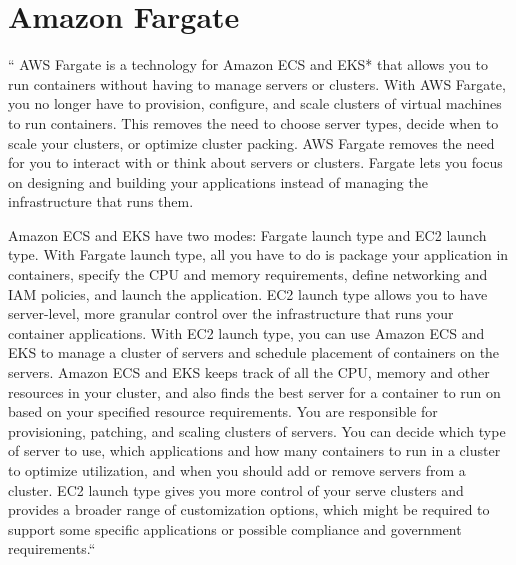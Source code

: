 \section{Amazon Fargate}

`` AWS Fargate is a technology for Amazon ECS and EKS* that allows you to run 
containers without having to manage servers or clusters. With AWS Fargate, you 
no longer have to provision, configure, and scale clusters of virtual machines 
to run containers. This removes the need to choose server types, decide when
to scale your clusters, or optimize cluster packing. AWS Fargate removes the 
need for you to interact with or think about servers or clusters. Fargate lets 
you focus on designing and building your applications instead of managing
the infrastructure that runs them.


Amazon ECS and EKS have two modes: Fargate launch type and EC2 launch type.
With Fargate launch type, all you have to do is package your application in 
containers, specify the CPU and memory requirements, define networking and 
IAM policies, and launch the application. EC2 launch type allows you to have 
server-level, more granular control over the infrastructure that runs your
container applications. With EC2 launch type, you can use Amazon ECS and EKS
to manage a cluster of servers and schedule placement of containers on the 
servers. Amazon ECS and EKS keeps track of all the CPU, memory and other 
resources in your cluster, and also finds the best server for a container to
run on based on your specified resource requirements. You are responsible
for provisioning, patching, and scaling clusters of servers. You can decide
which type of server to use, which applications and how many containers to
run in a cluster to optimize utilization, and when you should add or remove
servers from a cluster. EC2 launch type gives you more control of your serve
clusters and provides a broader range of customization options, which might
be required to support some specific applications or possible compliance and
government requirements.``\cite{hid-sp18-522-fargate}
